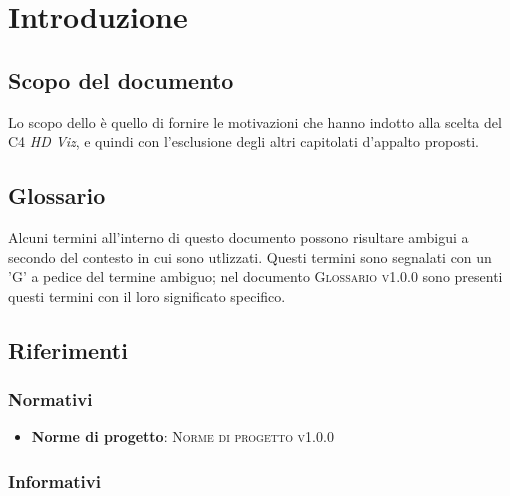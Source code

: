 \documentclass{article}
\begin{document}


\section{Introduzione}%
\label{sec:introduzione}

\subsection{Scopo del documento}%
\label{sub:scopo_del_documento}
Lo scopo dello \textsc{\placeholderTitle} è quello di fornire le motivazioni che hanno indotto alla scelta del  C4 \emph{HD Viz}, e quindi con l'esclusione degli altri capitolati d'appalto proposti.

\subsection{Glossario}%
\label{sub:glossario}
Alcuni termini all'interno di questo documento possono risultare ambigui a secondo del contesto in cui sono utlizzati.
Questi termini sono segnalati con un 'G' a pedice del termine ambiguo; nel documento \textsc{Glossario v1.0.0} sono presenti questi termini con il loro significato specifico.


\subsection{Riferimenti}%
\label{sub:riferimenti}

\subsubsection{Normativi}%
\label{subs:normativi}

\begin{itemize}
  \item \textbf{Norme di progetto}: \textsc{Norme di progetto v1.0.0}
\end{itemize}

\subsubsection{Informativi}%
\label{subs:informativi}
\end{document}
